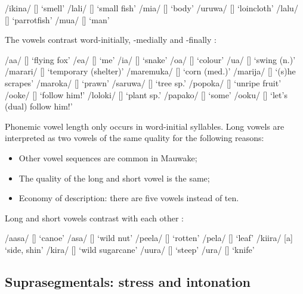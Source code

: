 \ea
\label{ex:2:highvowelallophones}
\ea
/ikina/  []  `smell'
\ex
/lali/  []  `small fish'
\ex
/mia/  []  `body'
\ex
/uruwa/  []  `loincloth'
\ex
/lalu/  []  `parrotfish'
\ex
/mua/  []  `man'
\z
\z

The vowels contrast word-initially, -medially and -finally :

\ea
\label{ex:2:vowelcontrasts}
\ea
/a{\textphi}a/  []  `flying fox'
\ex
/e{\textphi}a/  []  `me'
\ex
/i{\textphi}a/  []  `snake'
\ex
/o{\textphi}a/  []  `colour'
\ex
/u{\textphi}a/  []  `swing (n.)'
\ex
/marari/  []  `temporary (shelter)'
\ex
/maremuka/  []  `corn (med.)'
\ex
/marija/  []  `(s)he scrapes'
\ex
/maroka/  []  `prawn'
\ex
/saruwa/  []  `tree sp.'
\ex
/popoka/  []  `unripe fruit'
\ex
/ooke/  []  `follow him!'
\ex
/loloki/  []  `plant sp.'
\ex
/papako/  []  `some'
\ex
/ooku/  []  `let's (dual) follow him!'
\z
\z

Phonemic vowel length only occurs in word-initial syllables.  Long vowels are interpreted as two vowels of the same quality for the following reasons:


\begin{itemize}
\item Other vowel sequences are common in Mauwake;
\item The quality of the long and short vowel is the same;
\item Economy of description: there are five vowels instead of ten.
\end{itemize}

Long and short vowels contrast with each other :

\ea
\label{ex:2:longshortcontrasts}
\ea
/aasa/  []  `canoe'
\ex
/asa/  []  `wild  nut'
\ex
/peela/  []  `rotten'
\ex
/pela/  []  `leaf'
\ex
/kiira/  [a]  `side, shin'
\ex
/kira/  []  `wild sugarcane'
\ex
/{\textphi}uura/  []  `steep'
\ex
/{\textphi}ura/  []  `knife'
\z
\z

\subsection{Suprasegmentals: stress and intonation}


